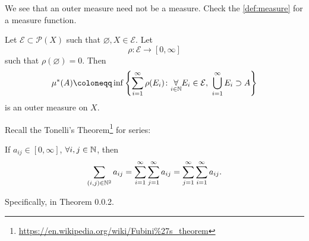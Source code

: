 \begin{remark}
	We see that an outer measure need not be a measure. Check the \autoref{def:measure} for a measure function.
\end{remark}

\begin{proposition}\label{prop:outer-measure}
	Let \(\mathcal{E} \subset \mathcal{P} (X)\) such that \(\varnothing, X \in  \mathcal{E} \). Let
	\[
		\rho\colon \mathcal{E} \to [0, \infty ]
	\]
	such that \(\rho(\varnothing ) = 0\). Then
	\[
		\mu^{*} (A) \coloneqq \inf\left\{\sum\limits_{i=1}^{\infty} \rho(E_{i})\colon \underset{i\in \mathbb{\MakeUppercase{N}} }{\forall}E_{i}\in \mathcal{E},\ \bigcup\limits_{i=1}^{\infty} E_{i}\supset A\right\}
	\]
	is an outer measure on \(X\).
\end{proposition}

\begin{note}\label{thm:Tonell}
	Recall the Tonelli's Theorem\footnote{\url{https://en.wikipedia.org/wiki/Fubini\%27s_theorem}} for series:
	\par If \(a_{ij}\in [0, \infty ]\), \(\forall i, j\in \mathbb{\MakeUppercase{N}} \), then
	\[
		\sum\limits_{(i, j)\in\mathbb{\MakeUppercase{N}} ^2}a_{ij} = \sum\limits_{i=1}^{\infty} \sum\limits_{j=1}^{\infty} a_{ij} = \sum\limits_{j=1}^{\infty} \sum\limits_{i=1}^{\infty} a_{ij}.
	\]

	Specifically, in \cite{tao2013introduction} Theorem 0.0.2.
\end{note}
